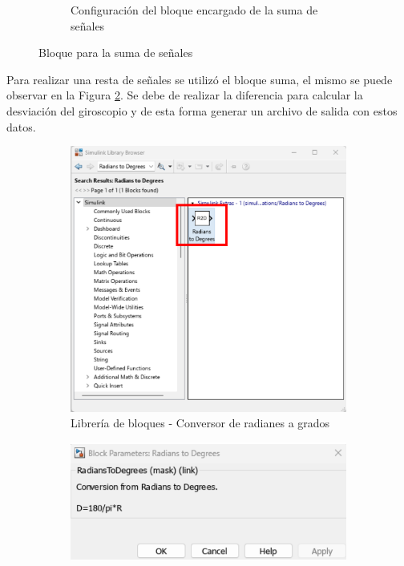 \begin{figure}[htbp]
\begin{subfigure}[b]{0.45\textwidth}
        \caption{Configuración del bloque encargado de la suma de señales}
        \label{fig:config_add_IMU}
    \end{subfigure}
    \caption{Bloque para la suma de señales}
    \label{fig:add_of_some_signals}
\end{figure}

Para realizar una resta de señales se utilizó el bloque suma, el mismo se puede observar en la Figura \ref{fig:add_of_some_signals}. Se debe de realizar la diferencia para  calcular la desviación del giroscopio y de esta forma generar un archivo de salida con estos datos. 


\begin{figure}[htbp]
    \centering
    \begin{subfigure}[b]{0.35\textwidth}
        \centering
        \includegraphics[width=\textwidth]{fig/Capitulo5/Caso_de_estudio_IMU/Generador_de_salidas/libreria_bloque__rad_2_deg.pdf}
        \caption{Librería de bloques - Conversor de radianes a grados}
        \label{fig:lib_bloques_R2D}
    \end{subfigure}
    \hfill
    \begin{subfigure}[b]{0.45\textwidth}
        \centering
        \includegraphics[width=\textwidth]{fig/Capitulo5/Caso_de_estudio_IMU//Generador_de_salidas/configuracion_rad_2_deg.pdf}

\end{subfigure}
\end{figure}
